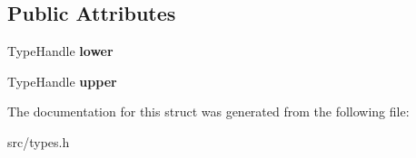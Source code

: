\subsection*{Public Attributes}
\begin{DoxyCompactItemize}
\item 
\hypertarget{structv8_1_1internal_1_1_bounds_impl_aac854c13587f0688751bf35254f746eb}{}Type\+Handle {\bfseries lower}\label{structv8_1_1internal_1_1_bounds_impl_aac854c13587f0688751bf35254f746eb}

\item 
\hypertarget{structv8_1_1internal_1_1_bounds_impl_abdabba77770b14836a3e5e974282c50a}{}Type\+Handle {\bfseries upper}\label{structv8_1_1internal_1_1_bounds_impl_abdabba77770b14836a3e5e974282c50a}

\end{DoxyCompactItemize}


The documentation for this struct was generated from the following file\+:\begin{DoxyCompactItemize}
\item 
src/types.\+h\end{DoxyCompactItemize}
